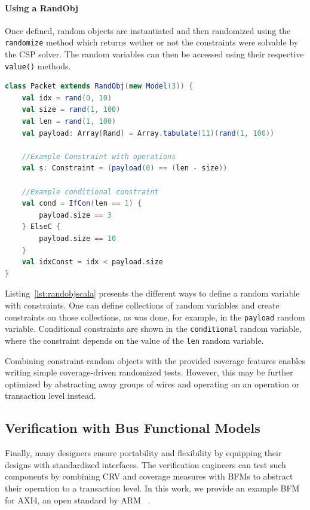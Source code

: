 \documentclass[conference]{IEEEtran}
\begin{document}
\paragraph{Using a RandObj} Once defined, random objects are instantiated and then randomized using the \texttt{randomize} method which returns wether or not the constraints were solvable by the CSP solver. 
The random variables can then be accessed using their respective \texttt{value()} methods.

\begin{lstlisting}[language=scala, caption={Usage of a random object. \texttt{rand(min, max, type=Normal)} is used to declare a random variable. Any operation on a random variable generates a constraint.}, label={lst:randobjscala}]    
class Packet extends RandObj(new Model(3)) {
    val idx = rand(0, 10)
    val size = rand(1, 100)
    val len = rand(1, 100)
    val payload: Array[Rand] = Array.tabulate(11)(rand(1, 100))

    //Example Constraint with operations
    val s: Constraint = (payload(0) == (len - size))
	
    //Example conditional constraint
    val cond = IfCon(len == 1) {
        payload.size == 3
    } ElseC {
        payload.size == 10
    }
    val idxConst = idx < payload.size
}
\end{lstlisting}

Listing~\ref{lst:randobjscala} presents the different ways to define a random variable with constraints.
One can define collections of random variables and create constraints on those collections, as was done, for example, in the \texttt{payload} random variable. 
Conditional constraints are shown in the \texttt{conditional} random variable, where the constraint depends on the value of the \texttt{len} random variable. 

Combining constraint-random objects with the provided coverage features enables writing simple coverage-driven randomized tests. 
However, this may be further optimized by abstracting away groups of wires and operating on an operation or transaction level instead.

\subsection{Verification with Bus Functional Models}
Finally, many designers ensure portability and flexibility by equipping their designs with standardized interfaces. 
The verification engineers can test such components by combining CRV and coverage measures with BFMs to abstract their 
operation to a transaction level. In this work, we provide an example BFM for AXI4, an open standard by ARM~
\cite{axi4standard}.
\end{document}
